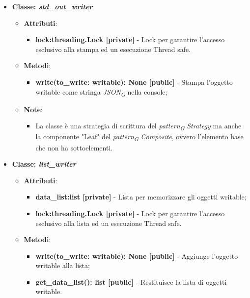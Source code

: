 \begin{itemize}
\begin{itemize}
\begin{itemize}
        \end{itemize}
    \end{itemize}
    \item{\textbf{Classe: \textit{std\_out\_writer}}}
    \begin{itemize}
    \item\textbf{Attributi}:
        \begin{itemize}
        \item \textbf{lock:threading.Lock [private]} - Lock per garantire l'accesso esclusivo alla stampa ed un esecuzione Thread safe.
    \end{itemize}
    \item \textbf{Metodi};
    \begin{itemize}
        \item \textbf{write(to\_write: writable): None [public]} - Stampa l'oggetto writable come stringa \textit{JSON}\textsubscript{\textit{G}} nella console;
    \end{itemize}
    \item\textbf{Note}:
        \begin{itemize}
            \item La classe è una strategia di scrittura del \textit{pattern}\textsubscript{\textit{G}} \textit{Strategy} ma anche la componente "Leaf" del \textit{pattern}\textsubscript{\textit{G}} \textit{Composite}, ovvero l'elemento base che non ha sottoelementi.
        \end{itemize}
    \end{itemize}
    \item{\textbf{Classe: \textit{list\_writer}}}
    \begin{itemize}
    \item\textbf{Attributi}:
        \begin{itemize}
        \item \textbf{data\_list:list [private]} - Lista per memorizzare gli oggetti writable;
        \item \textbf{lock:threading.Lock [private]} - Lock per garantire l'accesso esclusivo alla lista ed un esecuzione Thread safe.
    \end{itemize}
    \item \textbf{Metodi}:
    \begin{itemize}
        \item \textbf{write(to\_write: writable): None [public]} - Aggiunge l'oggetto writable alla lista;
        \item \textbf{get\_data\_list(): list [public]} - Restituisce la lista di oggetti writable.

\end{itemize}
\end{itemize}
\end{itemize}
